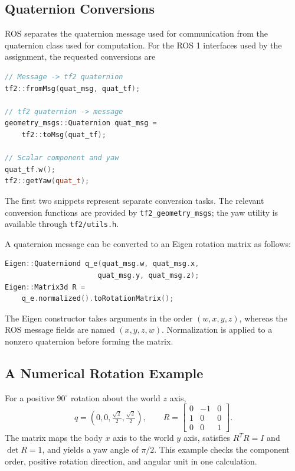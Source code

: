\documentclass[letterpaper,10pt,conference]{ieeeconf}
\begin{document}
\subsection{Quaternion Conversions}
ROS separates the quaternion message used for communication from the quaternion class used for computation. For the ROS 1 interfaces used by the assignment, the requested conversions are
\begin{lstlisting}[language=C++]
// Message -> tf2 quaternion
tf2::fromMsg(quat_msg, quat_tf);

// tf2 quaternion -> message
geometry_msgs::Quaternion quat_msg =
    tf2::toMsg(quat_tf);

// Scalar component and yaw
quat_tf.w();
tf2::getYaw(quat_t);
\end{lstlisting}
The first two snippets represent separate conversion tasks. The relevant conversion functions are provided by \texttt{tf2\_geometry\_msgs}; the yaw utility is available through \texttt{tf2/utils.h}\cite{tf2}.

A quaternion message can be converted to an Eigen rotation matrix as follows:
\begin{lstlisting}[language=C++]
Eigen::Quaterniond q_e(quat_msg.w, quat_msg.x,
                      quat_msg.y, quat_msg.z);
Eigen::Matrix3d R =
    q_e.normalized().toRotationMatrix();
\end{lstlisting}
The Eigen constructor takes arguments in the order $(w,x,y,z)$, whereas the ROS message fields are named $(x,y,z,w)$. Normalization is applied to a nonzero quaternion before forming the matrix\cite{eigen}.

\subsection{A Numerical Rotation Example}
For a positive $90^\circ$ rotation about the world $z$ axis,
\begin{equation}
q=(0,0,\tfrac{\sqrt2}{2},\tfrac{\sqrt2}{2}),\qquad
R=\begin{bmatrix}0&-1&0\\1&0&0\\0&0&1\end{bmatrix}.
\end{equation}
The matrix maps the body $x$ axis to the world $y$ axis, satisfies $R^TR=I$ and $\det R=1$, and yields a yaw angle of $\pi/2$. This example checks the component order, positive rotation direction, and angular unit in one calculation.
\end{document}
